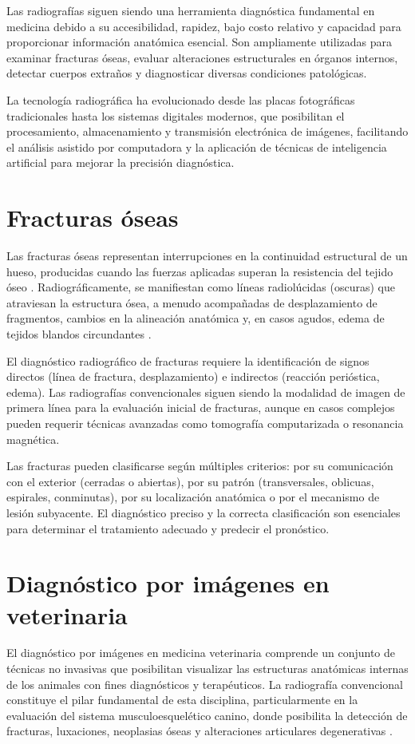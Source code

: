 {Las radiografías siguen siendo una herramienta diagnóstica fundamental en medicina debido a su accesibilidad, rapidez, bajo costo relativo y capacidad para proporcionar información anatómica esencial. Son ampliamente utilizadas para examinar fracturas óseas, evaluar alteraciones estructurales en órganos internos, detectar cuerpos extraños y diagnosticar diversas condiciones patológicas.

La tecnología radiográfica ha evolucionado desde las placas fotográficas tradicionales hasta los sistemas digitales modernos, que posibilitan el procesamiento, almacenamiento y transmisión electrónica de imágenes, facilitando el análisis asistido por computadora y la aplicación de técnicas de inteligencia artificial para mejorar la precisión diagnóstica.


\section{Fracturas óseas}
Las fracturas óseas representan interrupciones en la continuidad estructural de un hueso, producidas cuando las fuerzas aplicadas superan la resistencia del tejido óseo \cite{nauth2020fracture}. Radiográficamente, se manifiestan como líneas radiolúcidas (oscuras) que atraviesan la estructura ósea, a menudo acompañadas de desplazamiento de fragmentos, cambios en la alineación anatómica y, en casos agudos, edema de tejidos blandos circundantes \cite{browner2019skeletal}.

El diagnóstico radiográfico de fracturas requiere la identificación de signos directos (línea de fractura, desplazamiento) e indirectos (reacción perióstica, edema). Las radiografías convencionales siguen siendo la modalidad de imagen de primera línea para la evaluación inicial de fracturas, aunque en casos complejos pueden requerir técnicas avanzadas como tomografía computarizada o resonancia magnética.

Las fracturas pueden clasificarse según múltiples criterios: por su comunicación con el exterior (cerradas o abiertas), por su patrón (transversales, oblicuas, espirales, conminutas), por su localización anatómica o por el mecanismo de lesión subyacente. El diagnóstico preciso y la correcta clasificación son esenciales para determinar el tratamiento adecuado y predecir el pronóstico.

\section{Diagnóstico por imágenes en veterinaria}
El diagnóstico por imágenes en medicina veterinaria comprende un conjunto de técnicas no invasivas que posibilitan visualizar las estructuras anatómicas internas de los animales con fines diagnósticos y terapéuticos. La radiografía convencional constituye el pilar fundamental de esta disciplina, particularmente en la evaluación del sistema musculoesquelético canino, donde posibilita la detección de fracturas, luxaciones, neoplasias óseas y alteraciones articulares degenerativas \cite{thrall2018textbook}.

}

